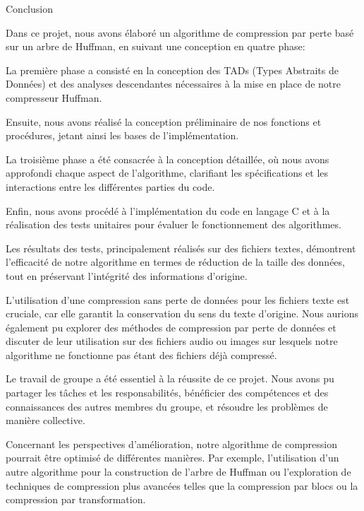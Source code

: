 Conclusion

Dans ce projet, nous avons élaboré un algorithme de compression par perte basé sur un arbre de Huffman, en suivant une conception en quatre phase:

    La première phase a consisté en la conception des TADs (Types Abstraits de Données) et des analyses descendantes nécessaires à la mise en place de notre compresseur Huffman.

    Ensuite, nous avons réalisé la conception préliminaire de nos fonctions et procédures, jetant ainsi les bases de l'implémentation.

    La troisième phase a été consacrée à la conception détaillée, où nous avons approfondi chaque aspect de l'algorithme, clarifiant les spécifications et les interactions entre les différentes parties du code.

    Enfin, nous avons procédé à l'implémentation du code en langage C et à la réalisation des tests unitaires pour évaluer le fonctionnement des algorithmes.

Les résultats des tests, principalement réalisés sur des fichiers textes, démontrent l'efficacité de notre algorithme en termes de réduction de la taille des données, tout en préservant l'intégrité des informations d'origine.

L'utilisation d'une compression sans perte de données pour les fichiers texte est cruciale, car elle garantit la conservation du sens du texte d'origine. Nous aurions également pu explorer des méthodes de compression par perte de données et discuter de leur utilisation sur des fichiers audio ou images sur lesquels notre algorithme ne fonctionne pas étant des fichiers déjà compressé.

Le travail de groupe a été essentiel à la réussite de ce projet. Nous avons pu partager les tâches et les responsabilités, bénéficier des compétences et des connaissances des autres membres du groupe, et résoudre les problèmes de manière collective.

Concernant les perspectives d'amélioration, notre algorithme de compression pourrait être optimisé de différentes manières. Par exemple, l'utilisation d'un autre algorithme pour la construction de l'arbre de Huffman ou l'exploration de techniques de compression plus avancées telles que la compression par blocs ou la compression par transformation.



